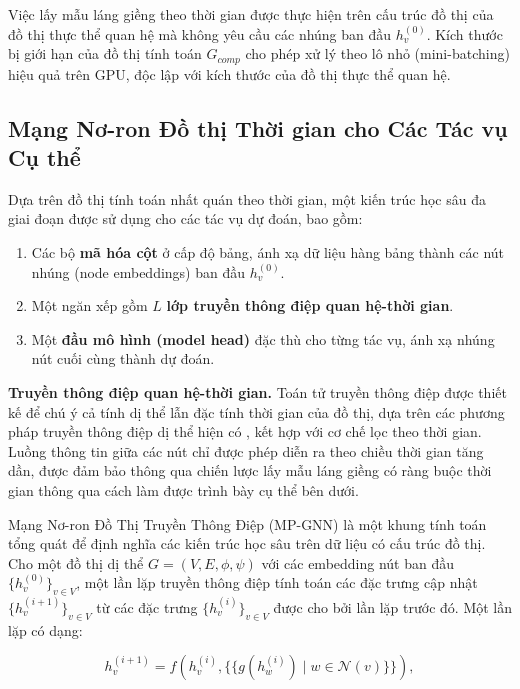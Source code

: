 Việc lấy mẫu láng giềng theo thời gian được thực hiện trên cấu trúc đồ thị của đồ thị thực thể quan hệ mà không yêu cầu các nhúng ban đầu $h_{v}^{(0)}$. Kích thước bị giới hạn của đồ thị tính toán $G_{comp}$ cho phép xử lý theo lô nhỏ (mini-batching) hiệu quả trên GPU, độc lập với kích thước của đồ thị thực thể quan hệ.

\subsection{Mạng Nơ-ron Đồ thị Thời gian cho Các Tác vụ Cụ thể} \label{sec:encoders}
Dựa trên đồ thị tính toán nhất quán theo thời gian, một kiến trúc học sâu đa giai đoạn được sử dụng cho các tác vụ dự đoán, bao gồm:
\begin{enumerate}
\item Các bộ \textbf{mã hóa cột} ở cấp độ bảng, ánh xạ dữ liệu hàng bảng thành các nút nhúng (node embeddings) ban đầu $h_v^{(0)}$.
\item Một ngăn xếp gồm $L$ \textbf{lớp truyền thông điệp quan hệ-thời gian}.
\item Một \textbf{đầu mô hình (model head)} đặc thù cho từng tác vụ, ánh xạ nhúng nút cuối cùng thành dự đoán.
\end{enumerate}

\textbf{Truyền thông điệp quan hệ-thời gian.}
Toán tử truyền thông điệp được thiết kế để chú ý cả tính dị thể lẫn đặc tính thời gian của đồ thị, dựa trên các phương pháp truyền thông điệp dị thể hiện có \cite{gilmer2017neural,fey2019fast,schlichtkrull2018modeling,hu2020heterogeneous}, kết hợp với cơ chế lọc theo thời gian. Luồng thông tin giữa các nút chỉ được phép diễn ra theo chiều thời gian tăng dần, được đảm bảo thông qua chiến lược lấy mẫu láng giềng có ràng buộc thời gian thông qua cách làm được trình bày cụ thể bên dưới.

Mạng Nơ-ron Đồ Thị Truyền Thông Điệp (MP-GNN) \cite{gilmer2017neural, fey2019fast} là một khung tính toán tổng quát để định nghĩa các kiến trúc học sâu trên dữ liệu có cấu trúc đồ thị. Cho một đồ thị dị thể $G = (V, E, \phi, \psi)$ với các embedding nút ban đầu $\{h_v^{(0)}\}_{v \in V}$, một lần lặp truyền thông điệp tính toán các đặc trưng cập nhật $\{h_v^{(i+1)}\}_{v \in V}$ từ các đặc trưng $\{h_v^{(i)}\}_{v \in V}$ được cho bởi lần lặp trước đó. Một lần lặp có dạng:

\begin{equation}
h_v^{(i+1)} = f\left(h_v^{(i)}, \{\!\!\{g(h_w^{(i)}) \mid w \in \mathcal{N}(v)\}\!\!\}\right),
\label{eq:ct1}
\end{equation}


